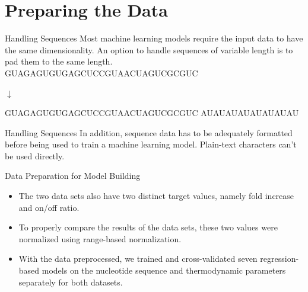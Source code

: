 \documentclass[9pt, dvipsnames]{beamer}
\begin{document}
\section{Preparing the Data}

\begin{frame}{Handling Sequences}
    Most machine learning models require the input data to have the same dimensionality.
    An option to handle sequences of variable length is to pad them to the same length.
    \\ \pause
    \vspace{.25in}
        \textellipsis GUAGAGUGUGAGCUCCGUAACUAGUCGCGUC  \\ \pause
        \begin{center}
        $\downarrow$
        \end{center}
        \textellipsis GUAGAGUGUGAGCUCCGUAACUAGUCGCGUC{\color{st} AUAUAUAUAUAUAUAU}
\end{frame}

\begin{frame}{Handling Sequences}
    In addition, sequence data has to be adequately formatted before being used to
    train a machine learning model. Plain-text characters can't be used directly. \\
    \vspace{.25in}
    \begin{center}
    \end{center}
\end{frame}

\begin{frame}{Data Preparation for Model Building}
    \begin{itemize}
        \item The two data sets also have two distinct target values, namely
        fold increase and on/off ratio. \pause
        \item To properly compare the results of the data sets, these two values
        were normalized using range-based normalization.
        \pause
        \item With the data preprocessed, we trained and cross-validated seven
        regression-based models on the nucleotide sequence and thermodynamic parameters
        separately for both datasets.
    \end{itemize}
\end{frame}
\end{document}
